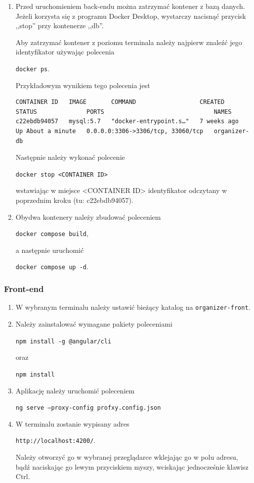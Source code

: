 \documentclass[a4paper,twoside,12pt]{book}
\begin{document}
\begin{enumerate}
	\item Przed uruchomieniem back-endu można zatrzymać kontener z bazą danych. Jeżeli korzysta się z programu Docker Desktop, wystarczy nacisnąć przycisk ,,stop'' przy kontenerze ,,db''.

	Aby zatrzymać kontener z poziomu terminala należy najpierw znaleźć jego identyfikator używając polecenia 

	\texttt{docker ps}.

	Przykładowym wynikiem tego polecenia jest

	\begin{verbatim}
CONTAINER ID   IMAGE       COMMAND                  CREATED       STATUS              PORTS                               NAMES
c22ebdb94057   mysql:5.7   "docker-entrypoint.s…"   7 weeks ago   Up About a minute   0.0.0.0:3306->3306/tcp, 33060/tcp   organizer-db
	\end{verbatim}

	Następnie należy wykonać polecenie

	\texttt{docker stop <CONTAINER ID>}

	wstawiając w miejsce <CONTAINER ID> identyfikator odczytany w poprzednim kroku (tu: c22ebdb94057).

	\item Obydwa kontenery należy zbudować poleceniem 

	\texttt{docker compose build},

	a następnie uruchomić 

	\texttt{docker compose up -d}.
    \end{enumerate}

\subsubsection{Front-end}

\begin{enumerate}
	 \item W wybranym terminalu należy ustawić bieżący katalog na \texttt{organizer-front}.

	 \item Należy zainstalować wymagane pakiety poleceniami

	 \texttt{npm install -g @angular/cli} 
	 
	 oraz
	 
	 \texttt{npm install}

	 \item Aplikację należy uruchomić poleceniem

	 \texttt{ng serve --proxy-config profxy.config.json}

	 \item W terminalu zostanie wypisany adres 

	 \texttt{http://localhost:4200/}.

	Należy otworzyć go w wybranej przeglądarce wklejając go w polu adresu, bądź naciskając go lewym przyciskiem myszy, wciskając jednocześnie klawisz Ctrl.

	 \end{enumerate}
\end{document}
